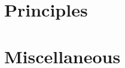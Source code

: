 \documentclass{article}
\begin{document}

\section{Principles}


\section{Miscellaneous}


\printbibliography[heading=bibintoc]
	
\end{document}
